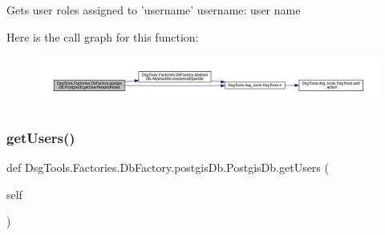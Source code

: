 \begin{DoxyVerb}Gets user roles assigned to 'username'
username: user name
\end{DoxyVerb}
 Here is the call graph for this function\+:
\nopagebreak
\begin{figure}[H]
\begin{center}
\leavevmode
\includegraphics[width=350pt]{class_dsg_tools_1_1_factories_1_1_db_factory_1_1postgis_db_1_1_postgis_db_a1f4aff5bd853804b38968bdb6ad64063_cgraph}
\end{center}
\end{figure}
\mbox{\label{class_dsg_tools_1_1_factories_1_1_db_factory_1_1postgis_db_1_1_postgis_db_ac17ae70205533589c22ca8824ac246c5}} 
\subsubsection{\texorpdfstring{get\+Users()}{getUsers()}}
{\footnotesize\ttfamily def Dsg\+Tools.\+Factories.\+Db\+Factory.\+postgis\+Db.\+Postgis\+Db.\+get\+Users (\begin{DoxyParamCaption}\item[{}]{self }\end{DoxyParamCaption})}

